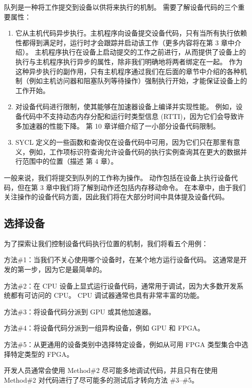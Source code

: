 队列是一种将工作提交到设备以供将来执行的机制。 需要了解设备代码的三个重要属性：

\begin{enumerate}
	\item 它从主机代码异步执行。主机程序向设备提交设备代码，只有当所有执行依赖性都得到满足时，运行时才会跟踪并启动该工作（更多内容将在第 3 章中介绍）。 主机程序执行在设备上启动提交的工作之前进行，从而提供了设备上的执行与主机程序执行异步的属性，除非我们明确地将两者绑定在一起。 作为这种异步执行的副作用，只有主机程序通过我们在后面的章节中介绍的各种机制（例如主机访问器和阻塞队列等待操作）强制执行开始，才能保证设备上的工作开始。

	\item 对设备代码进行限制，使其能够在加速器设备上编译并实现性能。 例如，设备代码中不支持动态内存分配和运行时类型信息 (RTTI)，因为它们会导致许多加速器的性能下降。 第 10 章详细介绍了一小部分设备代码限制。

	\item SYCL 定义的一些函数和查询仅在设备代码中可用，因为它们只在那里有意义，例如，工作项标识符查询允许设备代码的执行实例查询其在更大的数据并行范围中的位置（描述 第 4 章）。
\end{enumerate}

一般来说，我们将提交到队列的工作称为操作。 动作包括在设备上执行设备代码，但在第 3 章中我们将了解到动作还包括内存移动命令。 在本章中，由于我们关注操作的设备代码方面，因此我们将在大部分时间中具体提及设备代码。

\subsection{选择设备}
为了探索让我们控制设备代码执行位置的机制，我们将看五个用例：

方法\#1：当我们不关心使用哪个设备时，在某个地方运行设备代码。 这通常是开发的第一步，因为它是最简单的。

方法\#2：在 CPU 设备上显式运行设备代码，通常用于调试，因为大多数开发系统都有可访问的 CPU。 CPU 调试器通常也具有非常丰富的功能。

方法\#3：将设备代码分派到 GPU 或其他加速器。

方法\#4：将设备代码分派到一组异构设备，例如 GPU 和 FPGA。

方法\#5：从更通用的设备类别中选择特定设备，例如从可用 FPGA 类型集合中选择特定类型的 FPGA。

\begin{remark}
	开发人员通常会使用 Method\#2 尽可能多地调试代码，并且只有在使用 Method\#2 对代码进行了尽可能多的测试后才转向方法 \#3–\#5。
\end{remark}

